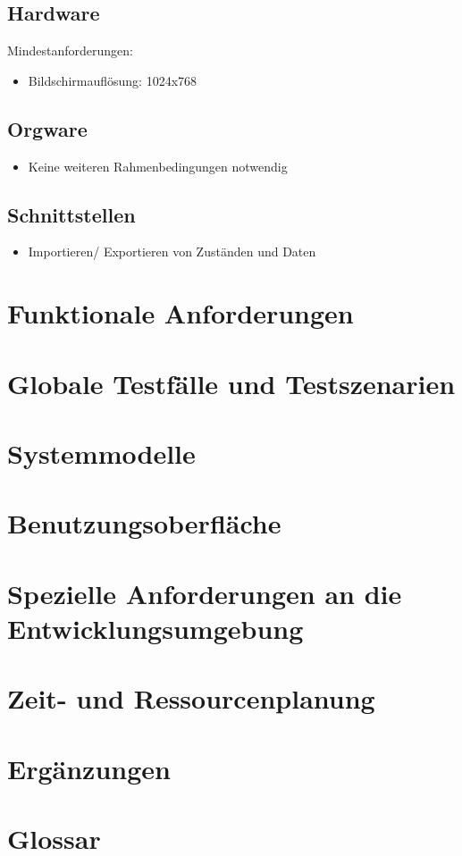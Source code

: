\documentclass[10pt,a4paper]{article}
\begin{document}
\subsection{Hardware}
Mindestanforderungen:
\begin{itemize}
\item Bildschirmauflösung: 1024x768
\end{itemize}


\subsection{Orgware}
\begin{itemize}
\item Keine weiteren Rahmenbedingungen notwendig
\end{itemize}


\subsection{Schnittstellen}
\begin{itemize}
\item Importieren/ Exportieren von Zuständen und Daten
\end{itemize}


\section{Funktionale Anforderungen}


\section{Globale Testfälle und Testszenarien}

\section{Systemmodelle}

\section{Benutzungsoberfläche}

\section{Spezielle Anforderungen an die Entwicklungsumgebung}

\section{Zeit- und Ressourcenplanung}

\section{Ergänzungen}

\section{Glossar}
\end{document}
